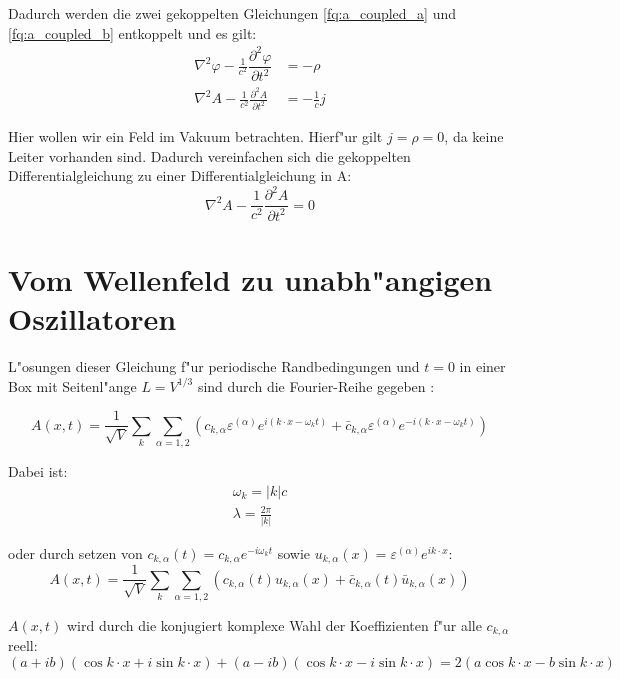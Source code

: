 Dadurch werden die zwei gekoppelten Gleichungen \ref{fq:a_coupled_a} und \ref{fq:a_coupled_b} entkoppelt und es gilt:
\begin{align*}
\nabla^2 \varphi - \frac{1}{c^2} \dfrac{\partial^2 \varphi}{\partial t^2} &= -\rho \\
\nabla^2 A - \frac{1}{c^2} \frac{\partial^2 A }{\partial t^2} &= - \frac{1}{c} j
\end{align*}

Hier wollen wir ein Feld im Vakuum betrachten. Hierf"ur gilt $j = \rho = 0$, da keine Leiter vorhanden sind.
Dadurch vereinfachen sich die gekoppelten Differentialgleichung zu einer Differentialgleichung in A:
\begin{equation} \label{fq:wave_dgl}
\nabla^2 A - \frac{1}{c^2} \frac{\partial^2 A }{\partial t^2} = 0
\end{equation}

\section{Vom Wellenfeld zu unabh"angigen Oszillatoren}
L"osungen dieser Gleichung f"ur periodische Randbedingungen und $t=0$ in einer Box mit Seitenl"ange $L = V^{1/3}$ sind durch die Fourier-Reihe gegeben \cite{fq:em_wave_eq}:

\begin{equation} \label{fq:wave_eq}
A(x,t) = \frac{1}{\sqrt{V}} \sum_k \sum_{\alpha=1,2} \left(c_{k,\alpha} \varepsilon^{(\alpha)} e^{i (k \cdot x - \omega_k t)} + \bar{c}_{k,\alpha} \varepsilon^{(\alpha)} e^{-i(k \cdot x - \omega_k t)}\right)
\end{equation}

Dabei ist:
\begin{align*}
\omega_k=|k|c \\
\lambda = \frac{2 \pi}{|k|}
\end{align*}

oder durch setzen von $c_{k,\alpha}(t) = c_{k,\alpha} e^{-i \omega_k t}$ sowie $u_{k,\alpha}(x) = \varepsilon^{(\alpha)} e^{ik \cdot x}$:
\begin{equation*}
A(x,t) = \frac{1}{\sqrt{V}} \sum_k \sum_{\alpha=1,2} \left(c_{k,\alpha}(t)u_{k,\alpha}(x) + \bar{c}_{k,\alpha}(t) \bar{u}_{k,\alpha}(x) \right)
\end{equation*}

$A(x,t)$ wird durch die konjugiert komplexe Wahl der Koeffizienten f"ur alle $c_{k,\alpha}$ reell:
\begin{equation*}
(a + ib)(\cos k \cdot x + i \sin k \cdot x ) + (a - ib)(\cos k \cdot x - i \sin k \cdot x ) = 2 ( a \cos k \cdot x - b \sin k \cdot x )
\end{equation*}

